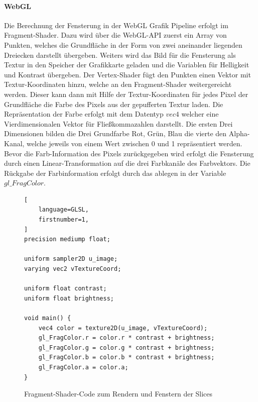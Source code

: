 \paragraph{WebGL}
Die Berechnung der Fensterung in der WebGL Grafik Pipeline erfolgt im Fragment-Shader.
Dazu wird über die WebGL-API zuerst ein Array von Punkten, 
welches die Grundfläche in der Form von zwei aneinander liegenden Dreiecken darstellt übergeben.
Weiters wird das Bild für die Fensterung als Textur in den Speicher der Grafikkarte geladen und die Variablen für Helligkeit und Kontrast übergeben.
Der Vertex-Shader fügt den Punkten einen Vektor mit Textur-Koordinaten hinzu, welche an den Fragment-Shader weitergereicht werden.
Dieser kann dann mit Hilfe der Textur-Koordinaten für jedes Pixel der Grundfläche die Farbe des Pixels aus der gepufferten Textur laden.
Die Repräsentation der Farbe erfolgt mit dem Datentyp $vec4$ welcher eine Vierdimensionalen Vektor für Fließkommazahlen darstellt.
Die ersten Drei Dimensionen bilden die Drei Grundfarbe Rot, Grün, Blau die vierte den Alpha-Kanal, welche jeweils von einem Wert zwischen 0 und 1 repräsentiert werden.
Bevor die Farb-Information des Pixels zurückgegeben wird erfolgt die Fensterung durch einen Linear-Transformation auf die drei Farbkanäle des Farbvektors.
Die Rückgabe der Farbinformation erfolgt durch das ablegen in der Variable $gl\_FragColor$.
\begin{figure}[t]
\begin{lstlisting}[
	language=GLSL,
	firstnumber=1,
]
precision mediump float;

uniform sampler2D u_image;
varying vec2 vTextureCoord;

uniform float contrast;
uniform float brightness;

void main() {
    vec4 color = texture2D(u_image, vTextureCoord);
    gl_FragColor.r = color.r * contrast + brightness;
    gl_FragColor.g = color.g * contrast + brightness;
    gl_FragColor.b = color.b * contrast + brightness;
    gl_FragColor.a = color.a;
}
\end{lstlisting}
\caption{Fragment-Shader-Code zum Rendern und Fenstern der Slices}
\end{figure}


